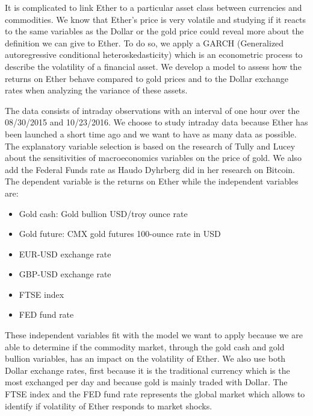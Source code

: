 \documentclass[11pt]{report}
\begin{document}
It is complicated to link Ether to a particular asset class between currencies and commodities. We know that Ether’s price is very volatile and studying if it reacts to the same variables as the Dollar or the gold price could reveal more about the definition we can give to Ether. To do so, we apply a GARCH (Generalized autoregressive conditional heteroskedasticity) which is an econometric process to describe the volatility of a financial asset. We develop a model to assess how the returns on Ether behave compared to gold prices and to the Dollar exchange rates when analyzing the variance of these assets.\smallbreak

The data consists of intraday observations with an interval of one hour over the 08/30/2015 and 10/23/2016. We choose to study intraday data because Ether has been launched a short time ago and we want to have as many data as possible. The explanatory variable selection is based on the research of Tully and Lucey\cite{TULLY} about the sensitivities of macroeconomics variables on the price of gold. We also add the Federal Funds rate as Haudo Dyhrberg\cite{HAUDO2} did in her research on Bitcoin. The dependent variable is the returns on Ether while the independent variables are:
\begin{itemize}
 	\item Gold cash: Gold bullion USD/troy ounce rate 
 	\item Gold future: CMX gold futures 100-ounce rate in USD
 	\item EUR-USD exchange rate
 	\item GBP-USD exchange rate
 	\item FTSE index
 	\item FED fund rate
\end{itemize}

These independent variables fit with the model we want to apply because we are able to determine if the commodity market, through the gold cash and gold bullion variables, has an impact on the volatility of Ether. We also use both Dollar exchange rates, first because it is the traditional currency which is the most exchanged per day and because gold is mainly traded with Dollar. The FTSE index and the FED fund rate represents the global market which allows to identify if volatility of Ether responds to market shocks. \clearpage
\end{document}
